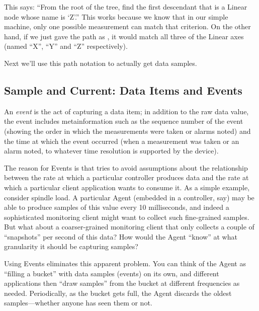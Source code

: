 \begin{quotation}
\end{quotation}

This says: ``From the root of the tree, find the first descendant that
is a Linear node whose name is `Z'.''
This works because we know that in our simple machine, 
only one possible measurement can match that criterion.  On the other
hand, if we just gave the path as , it would match all
three of the Linear axes (named ``X'', ``Y'' and ``Z'' respectively).

Next we'll use this path notation to actually get data samples.

\subsection{Sample and Current: Data Items and Events}
\label{sec:measurements}

An \emph{event} is the act of capturing a data item; in addition to the
raw data value, the event includes metainformation such as the sequence
number of the event (showing the order in which the measurements were
taken or alarms noted) and the time at which the event occurred (when a
measurement was taken or an alarm noted, to whatever time resolution is
supported by the device).


The reason for Events is that \mtc{} tries  to avoid assumptions
about the relationship between the rate at which a particular controller
produces  data and the rate at which
a particular client application wants to consume it.  As a simple
example, consider spindle load.  A particular Agent (embedded in a
controller, say) may be able to produce samples of this value every
10 milliseconds, and indeed a sophisticated monitoring client
might want to collect such fine-grained samples.  But what about a
coarser-grained monitoring client that only collects a couple of
``snapshots'' per second of this data?  How would the Agent
``know'' at what granularity it should be capturing samples?

Using Events eliminates this apparent problem.  You can
think of the Agent as ``filling a bucket'' with data samples (events)
on its own, and different applications then ``draw samples'' from the
bucket at different frequencies as needed.  Periodically, as the bucket
gets full, the Agent discards the oldest samples---whether
anyone has seen them or not.

